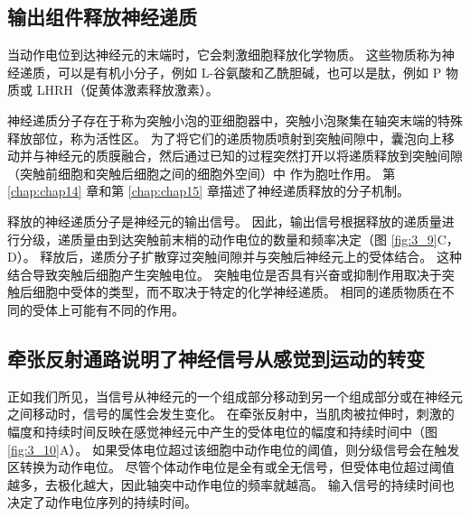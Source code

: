 \subsection{输出组件释放神经递质}
当动作电位到达神经元的末端时，它会刺激细胞释放化学物质。 
这些物质称为神经递质，可以是有机小分子，例如 L-谷氨酸和乙酰胆碱，也可以是肽，例如 P 物质或 LHRH（促黄体激素释放激素）。


神经递质分子存在于称为突触小泡的亚细胞器中，突触小泡聚集在轴突末端的特殊释放部位，称为活性区。 
为了将它们的递质物质喷射到突触间隙中，囊泡向上移动并与神经元的质膜融合，然后通过已知的过程突然打开以将递质释放到突触间隙（突触前细胞和突触后细胞之间的细胞外空间）中 作为胞吐作用。 
第 \ref{chap:chap14} 章和第 \ref{chap:chap15} 章描述了神经递质释放的分子机制。


释放的神经递质分子是神经元的输出信号。 
因此，输出信号根据释放的递质量进行分级，递质量由到达突触前末梢的动作电位的数量和频率决定（图 \ref{fig:3_9}C，D）。 
释放后，递质分子扩散穿过突触间隙并与突触后神经元上的受体结合。 
这种结合导致突触后细胞产生突触电位。 
突触电位是否具有兴奋或抑制作用取决于突触后细胞中受体的类型，而不取决于特定的化学神经递质。 
相同的递质物质在不同的受体上可能有不同的作用。


\subsection{牵张反射通路说明了神经信号从感觉到运动的转变}
正如我们所见，当信号从神经元的一个组成部分移动到另一个组成部分或在神经元之间移动时，信号的属性会发生变化。 
在牵张反射中，当肌肉被拉伸时，刺激的幅度和持续时间反映在感觉神经元中产生的受体电位的幅度和持续时间中（图 \ref{fig:3_10}A）。 
如果受体电位超过该细胞中动作电位的阈值，则分级信号会在触发区转换为动作电位。
尽管个体动作电位是全有或全无信号，但受体电位超过阈值越多，去极化越大，因此轴突中动作电位的频率就越高。 
输入信号的持续时间也决定了动作电位序列的持续时间。

